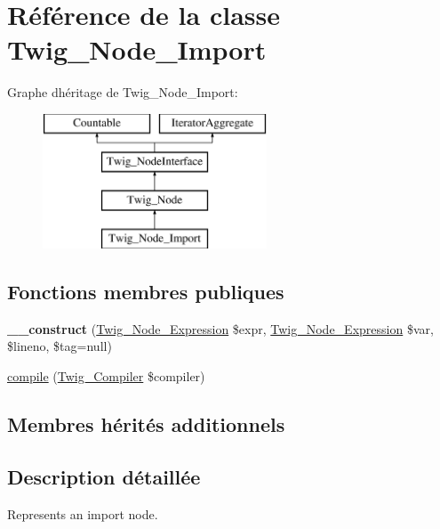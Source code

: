 \hypertarget{class_twig___node___import}{}\section{Référence de la classe Twig\+\_\+\+Node\+\_\+\+Import}
\label{class_twig___node___import}
Graphe d\textquotesingle{}héritage de Twig\+\_\+\+Node\+\_\+\+Import\+:\begin{figure}[H]
\begin{center}
\leavevmode
\includegraphics[height=4.000000cm]{class_twig___node___import}
\end{center}
\end{figure}
\subsection*{Fonctions membres publiques}
\begin{DoxyCompactItemize}
\item 
{\bfseries \+\_\+\+\_\+construct} (\hyperlink{class_twig___node___expression}{Twig\+\_\+\+Node\+\_\+\+Expression} \$expr, \hyperlink{class_twig___node___expression}{Twig\+\_\+\+Node\+\_\+\+Expression} \$var, \$lineno, \$tag=null)\hypertarget{class_twig___node___import_a53cd815bb8dde58d27defc0c69dce183}{}\label{class_twig___node___import_a53cd815bb8dde58d27defc0c69dce183}

\item 
\hyperlink{class_twig___node___import_a4e0faa87c3fae583620b84d3607085da}{compile} (\hyperlink{class_twig___compiler}{Twig\+\_\+\+Compiler} \$compiler)
\end{DoxyCompactItemize}
\subsection*{Membres hérités additionnels}


\subsection{Description détaillée}
Represents an import node.

